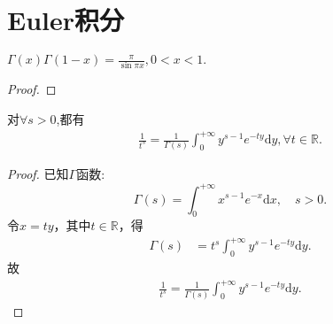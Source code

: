 \documentclass[../../main.tex]{subfiles}
\begin{document}
\section{Euler积分}

\begin{theorem}[余元公式]\label{theorem:余元公式}
$\Gamma(x)\Gamma(1-x)=\frac{\pi}{\sin\pi x},0<x<1.$
\end{theorem}
\begin{proof}

\end{proof}

\begin{proposition}\label{proposition:分式化积分-Gamma函数相关性质}
对$\forall s>0$,都有
\begin{align}\label{euqation:将分式化成积分形式}
\frac{1}{t^s}=\frac{1}{\Gamma \left( s \right)}\int_0^{+\infty}{y^{s-1}e^{-ty}\mathrm{d}y},\forall t\in \mathbb{R}.
\end{align}
\end{proposition}
\begin{proof}
已知$\Gamma $函数:\[\Gamma \left( s \right) =\int_0^{+\infty}{x^{s-1}e^{-x}\mathrm{d}x},\quad s>0.\]
令$x=ty$，其中$t\in \mathbb{R}$，得
\begin{align*}
\Gamma \left( s \right) &= t^s\int_0^{+\infty}{y^{s-1}e^{-ty}\mathrm{d}y} .
\end{align*}
故
\begin{align*}
\frac{1}{t^s}=\frac{1}{\Gamma \left( s \right)}\int_0^{+\infty}{y^{s-1}e^{-ty}\mathrm{d}y}.
\end{align*}
\end{proof}
\end{document}
